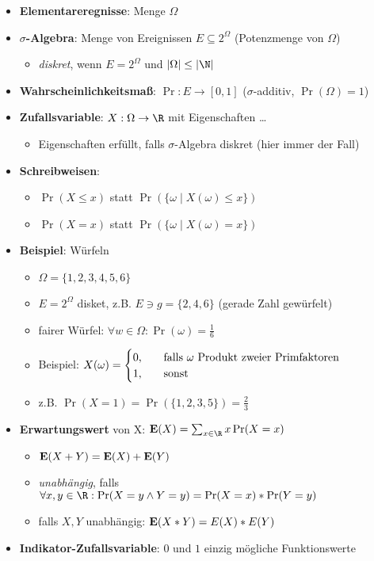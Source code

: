 \begin{itemize}
  \item \textbf{Elementareregnisse}: Menge $ \Omega $
  \item \textbf{$ \sigma $-Algebra}: Menge von Ereignissen $ E \subseteq 2^\Omega $ (Potenzmenge von $ \Omega $)
  \begin{itemize}
    \item \emph{diskret}, wenn $ E = 2^\Omega $ und $ \vert \Omega \vert \leq \vert \N \vert $
  \end{itemize}
  \item \textbf{Wahrscheinlichkeitsmaß}: $ \Pr: E \to [0,1]$ ($ \sigma $-additiv, $ \Pr(\Omega) = 1 $)
  \item \textbf{Zufallsvariable}: $ X : \Omega \to \R $ mit Eigenschaften \dots
  \begin{itemize}
    \item Eigenschaften erfüllt, falls $ \sigma $-Algebra diskret (hier immer der Fall)
  \end{itemize}
  \item \textbf{Schreibweisen}:
  \begin{itemize}
    \item $ \Pr(X \leq x) $ statt $ \Pr(\{ \omega \mid X(\omega) \leq x \}) $
    \item $ \Pr(X = x) $ statt $ \Pr(\{ \omega \mid X(\omega) = x \}) $
  \end{itemize}
  \item \textbf{Beispiel}: Würfeln
  \begin{itemize}
    \item $ \Omega = \{ 1, 2, 3, 4, 5, 6 \} $
    \item $ E = 2^\Omega $ disket, z.B. $ E \ni g = \{ 2, 4, 6 \} $ (gerade Zahl gewürfelt)
    \item fairer Würfel: $ \forall w \in \Omega : \Pr(\omega) = \frac{1}{6} $
    \item Beispiel: $ X(\omega) = \begin{cases}
      0\text{,} \quad &\text{falls $ \omega $ Produkt zweier Primfaktoren} \\
      1\text{,} \quad &\text{sonst}
    \end{cases} $
    \item z.B. $ \Pr(X = 1) = \Pr(\{ 1, 2, 3, 5 \}) = \frac{2}{3} $
  \end{itemize}
  \item \textbf{Erwartungswert} von X: $ \E(X) = \sum_{x \in \R}x\Pr(X = x) $
  \begin{itemize}
    \item $ \text{\textbf{E}}(X + Y) = \text{\textbf{E}}(X) + \text{\textbf{E}}(Y) $
    \item \emph{unabhängig}, falls $ \forall x, y \in \R : \Pr(X = y \wedge Y = y) = \Pr(X = x) * \Pr(Y = y) $
    \item falls $ X, Y $ unabhängig: $ \text{\textbf{E}}(X * Y) = E(X) * E(Y) $
  \end{itemize}
  \item \textbf{Indikator-Zufallsvariable}: $ 0 $ und $ 1 $ einzig mögliche Funktionswerte
\end{itemize}

